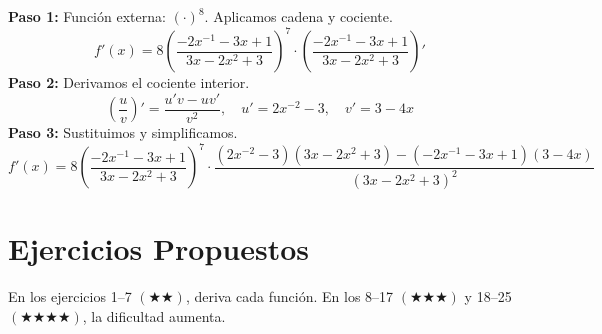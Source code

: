 \documentclass[12pt, letterpaper]{article}
\begin{document}
\begin{cuadrosolucion}
  \textbf{Paso 1:} Función externa: $(\cdot)^8$. Aplicamos cadena y cociente.
  \[
    f'(x) = 8\left(\frac{-2x^{-1} - 3x + 1}{3x - 2x^2 + 3}\right)^{7}
    \cdot \left(\frac{-2x^{-1} - 3x + 1}{3x - 2x^2 + 3}\right)'
  \]
  \textbf{Paso 2:} Derivamos el cociente interior.
  \[
    \left(\frac{u}{v}\right)' = \frac{u'v - uv'}{v^2},
    \quad u' = 2x^{-2} - 3,\quad v' = 3 - 4x
  \]
  \textbf{Paso 3:} Sustituimos y simplificamos.
  \[
    f'(x) = 8\left(\frac{-2x^{-1} - 3x + 1}{3x - 2x^2 + 3}\right)^{7}
    \cdot \frac{(2x^{-2} - 3)(3x-2x^2+3) - (-2x^{-1}-3x+1)(3-4x)}{(3x-2x^2+3)^2}
  \]
\end{cuadrosolucion}

\newpage
\section{Ejercicios Propuestos}

\noindent En los ejercicios 1--7 $(\bigstar\bigstar)$, deriva cada función. En los 8--17 $(\bigstar\bigstar\bigstar)$ y 18--25 $(\bigstar\bigstar\bigstar\bigstar)$, la dificultad aumenta.
\end{document}
